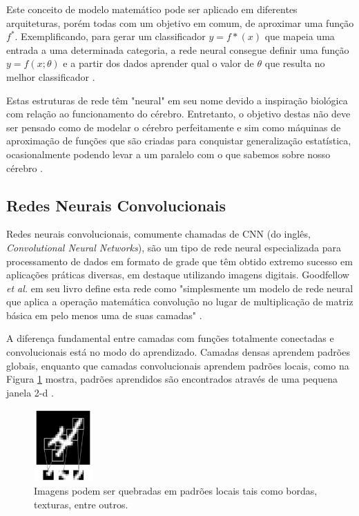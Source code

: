 \documentclass[12pt]{report}
\newcommand*{\captionsource}[2]{%
  \caption[{#1}]{%
    #1%
    \\\hspace{\linewidth}%
     \text{Fonte:}#2%
  }%
}
\begin{document}
Este conceito de modelo matemático pode ser aplicado em diferentes arquiteturas, porém todas com um objetivo em comum, de aproximar uma função $f^*$. Exemplificando, para gerar um classificador $y = f*(x)$ que mapeia uma entrada a uma determinada categoria, a rede neural consegue definir uma função $y = f(x;\theta)$ e a partir dos dados aprender qual o valor de $\theta$ que resulta no melhor classificador \cite{Goodfellow}.

Estas estruturas de rede têm "neural" em seu nome devido a inspiração biológica com relação ao funcionamento do cérebro. Entretanto, o objetivo destas não deve ser pensado como de modelar o cérebro perfeitamente e sim como máquinas de aproximação de funções que são criadas para conquistar generalização estatística, ocasionalmente podendo levar a um paralelo com o que sabemos sobre nosso cérebro \cite{Goodfellow}.

\subsection{Redes Neurais Convolucionais} \label{cnn}

Redes neurais convolucionais, comumente chamadas de \ac{CNN} (do inglês, \textit{Convolutional Neural Networks}), são um tipo de rede neural especializada para processamento de dados em formato de grade que têm obtido extremo sucesso em aplicações práticas diversas, em destaque utilizando imagens digitais. Goodfellow \textit{et al.} em seu livro define esta rede como "simplesmente um modelo de rede neural que aplica a operação matemática convolução no lugar de multiplicação de matriz básica em pelo menos uma de suas camadas" \cite{Goodfellow}.

A diferença fundamental entre camadas com funções totalmente conectadas e convolucionais está no modo do aprendizado. Camadas densas aprendem padrões globais, enquanto que camadas convolucionais aprendem padrões locais, como na Figura \ref{fig:quatro} mostra, padrões aprendidos são encontrados através de uma pequena janela 2-d \cite{chollet}. 

\begin{figure}
    \centering
    \includegraphics[width=0.2\textwidth]{images/covnet4.png}
    \captionsource{Imagens podem ser quebradas em padrões locais tais como bordas, texturas, entre outros.}{ \protect\cite{chollet}}
    \label{fig:quatro}
\end{figure}
\end{document}
